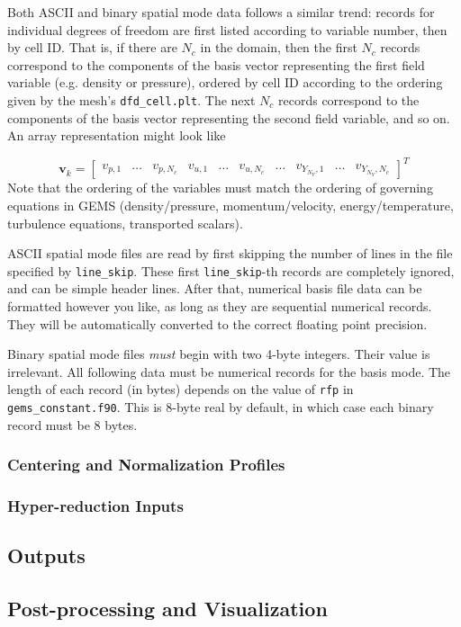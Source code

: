 Both ASCII and binary spatial mode data follows a similar trend: records for individual degrees of freedom are first listed according to variable number, then by cell ID. That is, if there are $N_c$ in the domain, then the first $N_c$ records correspond to the components of the basis vector representing the first field variable (e.g. density or pressure), ordered by cell ID according to the ordering given by the mesh's \verb|dfd_cell.plt|. The next $N_c$ records correspond to the components of the basis vector representing the second field variable, and so on. An array representation might look like

\begin{equation*}
    \mathbf{v}_k = 
    \begin{bmatrix}
        v_{p,1} & \hdots & v_{p, N_c} & v_{u, 1} & \hdots & v_{u, N_c} & \hdots & v_{Y_{N_Y}, 1} & \hdots & v_{Y_{N_Y}, N_c} 
    \end{bmatrix}^T
\end{equation*}
Note that the ordering of the variables must match the ordering of governing equations in GEMS (density/pressure, momentum/velocity, energy/temperature, turbulence equations, transported scalars).

ASCII spatial mode files are read by first skipping the number of lines in the file specified by \verb|line_skip|. These first \verb|line_skip|-th records are completely ignored, and can be simple header lines. After that, numerical basis file data can be formatted however you like, as long as they are sequential numerical records. They will be automatically converted to the correct floating point precision.

Binary spatial mode files \textit{must} begin with two 4-byte integers. Their value is irrelevant. All following data must be numerical records for the basis mode. The length of each record (in bytes) depends on the value of \verb|rfp| in \verb|gems_constant.f90|. This is 8-byte real by default, in which case each binary record must be 8 bytes.

\subsubsection{Centering and Normalization Profiles}

\subsubsection{Hyper-reduction Inputs}

\subsection{Outputs}

\subsection{Post-processing and Visualization}

